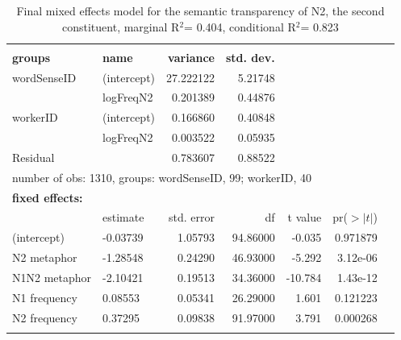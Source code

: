 \begin{table}[!htb]
\small
\begin{tabularx}{.95\textwidth}{llrrrrr}\lsptoprule
\multicolumn{7}{l}{\textbf{random effects:}}\\
 \textbf{groups}     &\textbf{name}       &\textbf{variance}&\textbf{std. dev.}&&&\\\midrule %
 wordSenseID&(intercept)&27.222122&5.21748&&&\\      
            &logFreqN2  & 0.201389&0.44876&&&\\ %
 workerID   &(intercept)& 0.166860&0.40848&&&\\      
            &logFreqN2  & 0.003522&0.05935&&&\\ %
 Residual   &           & 0.783607&0.88522&&&\\      
\multicolumn{7}{l}{number of obs: 1310, groups:  wordSenseID, 99; workerID, 40}\\[1ex]
% 
\multicolumn{7}{l}{\textbf{fixed effects:}}\\
             &{estimate}&{std. error}&      {df}&{t value}&{pr($>|t|$)}\\\midrule   
(intercept)  &-0.03739&   1.05793&94.86000& -0.035&0.971879\\   
N2 metaphor &-1.28548&   0.24290&46.93000& -5.292&3.12e-06\\
N1N2 metaphor&-2.10421&   0.19513&34.36000&-10.784&1.43e-12\\
N1 frequency    & 0.08553&   0.05341&26.29000&  1.601&0.121223\\   
N2 frequency    & 0.37295&   0.09838&91.97000&  3.791&0.000268\\\lspbottomrule
\end{tabularx}
  \caption{Final mixed effects model for the semantic transparency of N2,
    the second constituent, marginal R$^2$= 0.404, conditional
    R$^2$=  0.823}
  \label{tab:mixed-model4-bellschaefer2013}
\end{table}


